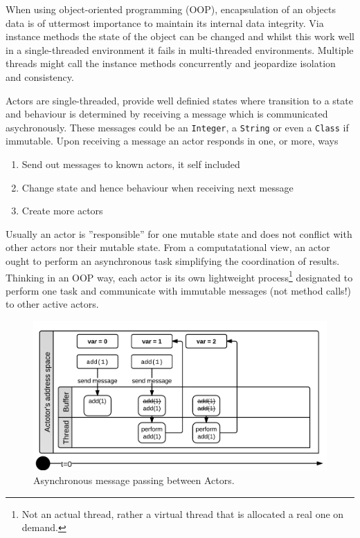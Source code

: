 \documentclass[a4paper,12pt]{kth-mag}
\begin{document}
When using object-oriented programming (OOP), encapsulation of an objects data is of uttermost importance to maintain its internal data integrity. Via instance methods the state of the object can be changed and whilst this work well in a single-threaded environment it fails in multi-threaded environments. Multiple threads might call the instance methods concurrently and jeopardize isolation and consistency. 

Actors are single-threaded, provide well definied states where transition to a state and behaviour is determined by receiving a message which is communicated asychronously. These messages could be an \texttt{Integer}, a \texttt{String} or even a \texttt{Class} if immutable. Upon receiving a message an actor responds in one, or more, ways \cite{HO09}

\begin{enumerate}
\item Send out messages to known actors, it self included
\item Change state and hence behaviour when receiving next message
\item Create more actors
\end{enumerate}

Usually an actor is ''responsible'' for one mutable state and does not conflict with other actors nor their mutable state. From a computatational view, an actor ought to perform an asynchronous task simplifying the coordination of results. Thinking in an OOP way, each actor is its own lightweight process\footnote{Not an actual thread, rather a virtual thread that is allocated a real one on demand.} designated to perform one task and communicate with immutable messages (not method calls!) to other active actors.

\begin{figure}[H]
    \begin{center}
    \includegraphics{images/ActorsAdd.png}
    \end{center}
    \caption{Asynchronous message passing between Actors.}
    \label{fig:actorsAdd}
\end{figure}
\end{document}

